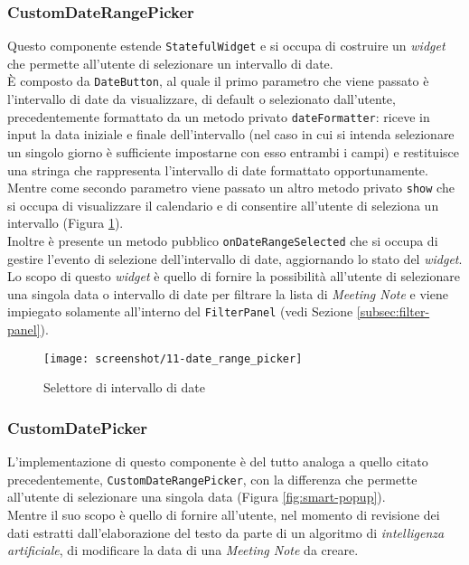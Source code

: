 \subsubsection*{CustomDateRangePicker}
\label{subsubsec:custom-date-range-picker}

Questo componente estende \lstinline{StatefulWidget} e si occupa di costruire un \emph{widget} che permette all'utente di selezionare un intervallo di date.\\
È composto da \lstinline{DateButton}, al quale il primo parametro che viene passato è l'intervallo di date da visualizzare, di default o selezionato dall'utente, precedentemente formattato da un metodo privato \lstinline{dateFormatter}: riceve in input la data iniziale e finale dell'intervallo (nel caso in cui si intenda selezionare un singolo giorno è sufficiente impostarne con esso entrambi i campi) e restituisce una stringa che rappresenta l'intervallo di date formattato opportunamente.\\
Mentre come secondo parametro viene passato un altro metodo privato \lstinline{show} che si occupa di visualizzare il calendario e di consentire all'utente di seleziona un intervallo (Figura \ref{fig:date-range-picker}). \\
Inoltre è presente un metodo pubblico \lstinline{onDateRangeSelected} che si occupa di gestire l'evento di selezione dell'intervallo di date, aggiornando lo stato del \emph{widget}. \\
Lo scopo di questo \emph{widget} è quello di fornire la possibilità all'utente di selezionare una singola data o intervallo di date per filtrare la lista di \emph{Meeting Note} e viene impiegato solamente all'interno del \lstinline{FilterPanel} (vedi Sezione \ref{subsec:filter-panel}).

\begin{figure}[!h] 
    \centering 
    \texttt{[image: screenshot/11-date\_range\_picker]} 
    \caption{Selettore di intervallo di date}
    \label{fig:date-range-picker}
\end{figure}

\subsubsection*{CustomDatePicker}
\label{subsubsec:custom-date-picker}

L'implementazione di questo componente è del tutto analoga a quello citato precedentemente, \lstinline{CustomDateRangePicker}, con la differenza che permette all'utente di selezionare una singola data (Figura \ref{fig:smart-popup}).\\
Mentre il suo scopo è quello di fornire all'utente, nel momento di revisione dei dati estratti dall'elaborazione del testo da parte di un algoritmo di \emph{intelligenza artificiale}, di modificare la data di una \emph{Meeting Note} da creare.

